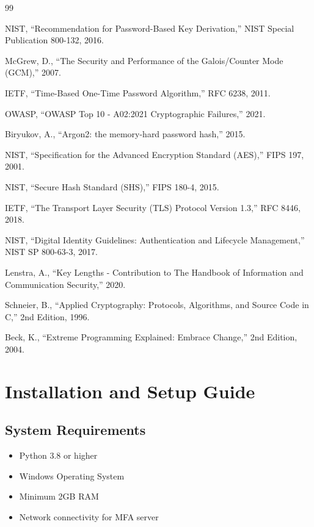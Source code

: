 \documentclass[12pt,a4paper]{report}
\begin{document}
\begin{thebibliography}{99}

 NIST, ``Recommendation for Password-Based Key Derivation,'' NIST Special Publication 800-132, 2016.

 McGrew, D., ``The Security and Performance of the Galois/Counter Mode (GCM),'' 2007.

 IETF, ``Time-Based One-Time Password Algorithm,'' RFC 6238, 2011.

 OWASP, ``OWASP Top 10 - A02:2021 Cryptographic Failures,'' 2021.

 Biryukov, A., ``Argon2: the memory-hard password hash,'' 2015.

 NIST, ``Specification for the Advanced Encryption Standard (AES),'' FIPS 197, 2001.

 NIST, ``Secure Hash Standard (SHS),'' FIPS 180-4, 2015.

 IETF, ``The Transport Layer Security (TLS) Protocol Version 1.3,'' RFC 8446, 2018.

 NIST, ``Digital Identity Guidelines: Authentication and Lifecycle Management,'' NIST SP 800-63-3, 2017.

 Lenstra, A., ``Key Lengths - Contribution to The Handbook of Information and Communication Security,'' 2020.

 Schneier, B., ``Applied Cryptography: Protocols, Algorithms, and Source Code in C,'' 2nd Edition, 1996.

 Beck, K., ``Extreme Programming Explained: Embrace Change,'' 2nd Edition, 2004.

\end{thebibliography}

\appendix

\chapter{Installation and Setup Guide}

\section{System Requirements}

\begin{itemize}
    \item Python 3.8 or higher
    \item Windows Operating System
    \item Minimum 2GB RAM
    \item Network connectivity for MFA server
\end{itemize}
\end{document}
